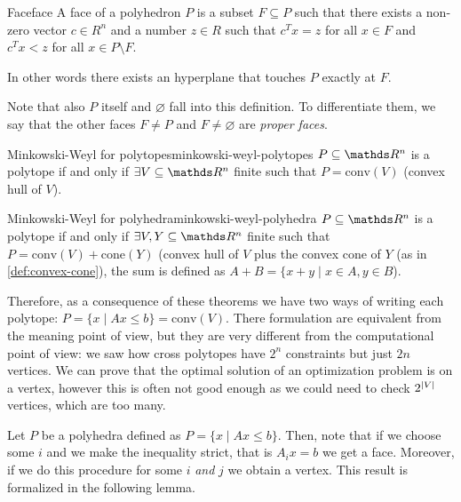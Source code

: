 \documentclass[12pt]{extarticle}
\begin{document}
\begin{definition}{Face}{face}
	A face of a polyhedron $P$ is a subset $F \subseteq P$ such that there exists a non-zero vector
	$c \in R^n$ and a number $z \in R$ such that $c^T x = z$ for all $x \in F$ and $c^T x < z$
	for all $x \in P \setminus F$.

	In other words there exists an hyperplane that touches $P$ exactly at $F$.

	Note that also $P$ itself and $\varnothing$ fall into this definition.
	To differentiate them, we say that the other faces $F \neq P$ and $F \neq \varnothing$ are
	\emph{proper faces}.
\end{definition}

\begin{theorem}{Minkowski-Weyl for polytopes}{minkowski-weyl-polytopes}
	$P \subseteq \R^n$ is a polytope if and only if $\exists V \subseteq \R^n$ finite such that
	$P = \mathrm{conv}(V)$ (convex hull of $V$).
\end{theorem}

\begin{theorem}{Minkowski-Weyl for polyhedra}{minkowski-weyl-polyhedra}
	$P \subseteq \R^n$ is a polytope if and only if $\exists V, Y \subseteq \R^n$ finite such that
	$P = \mathrm{conv}(V) + \mathrm{cone}(Y)$ (convex hull of $V$ plus
	the convex cone of $Y$ (as in \cref{def:convex-cone}),
	the sum is defined as $A + B = \{ x+ y \mid x \in A, y \in B$).
\end{theorem}

Therefore, as a consequence of these theorems we have two ways of writing each polytope:
$P = \{x \mid A x \leq b\} = \mathrm{conv}(V)$.
There formulation are equivalent from the meaning point of view, but they are very different from
the computational point of view: we saw how cross polytopes have $2^n$ constraints but just $2n$
vertices.
We can prove that the optimal solution of an optimization problem is on a vertex, however this
is often not good enough as we could need to check $2^\abs{V}$ vertices, which are too many.

Let $P$ be a polyhedra defined as $P = \{x \mid A x \leq b\}$. Then, note that if we choose some
$i$ and we make the inequality strict, that is $A_i x = b$ we get a face.
Moreover, if we do this procedure for some $i$ \emph{and} $j$ we obtain a vertex.
This result is formalized in the following lemma.
\end{document}
